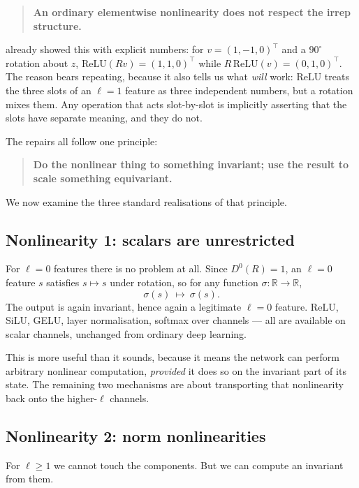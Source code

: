 \documentclass[11pt,a4paper]{report}
\theoremstyle{definition}
\theoremstyle{remark}
\newcommand{\RR}{\mathbb R}
\begin{document}
\begin{quote}
\textbf{An ordinary elementwise nonlinearity does not respect the irrep
structure.}
\end{quote}

 already showed this with explicit numbers: for
$v=(1,-1,0)^\top$ and a $90^\circ$ rotation about $z$,
$\mathrm{ReLU}(Rv)=(1,1,0)^\top$ while $R\,\mathrm{ReLU}(v)=(0,1,0)^\top$.
The reason bears repeating, because it also tells us what \emph{will} work:
$\mathrm{ReLU}$ treats the three slots of an $\ell=1$ feature as three
independent numbers, but a rotation mixes them. Any operation that acts
slot-by-slot is implicitly asserting that the slots have separate meaning,
and they do not.

The repairs all follow one principle:

\begin{quote}
\textbf{Do the nonlinear thing to something invariant; use the result to
scale something equivariant.}
\end{quote}

We now examine the three standard realisations of that principle.

\subsection{Nonlinearity 1: scalars are unrestricted}
\label{sec:nonlin-scalar}

For $\ell=0$ features there is no problem at all. Since $D^0(R)=1$, an
$\ell=0$ feature $s$ satisfies $s\mapsto s$ under rotation, so for any
function $\sigma:\RR\to\RR$,
\[
\sigma(s)\ \longmapsto\ \sigma(s) .
\]
The output is again invariant, hence again a legitimate $\ell=0$ feature.
$\mathrm{ReLU}$, SiLU, GELU, layer normalisation, softmax over channels ---
all are available on scalar channels, unchanged from ordinary deep learning.

This is more useful than it sounds, because it means the network can perform
arbitrary nonlinear computation, \emph{provided} it does so on the invariant
part of its state. The remaining two mechanisms are about transporting that
nonlinearity back onto the higher-$\ell$ channels.

\subsection{Nonlinearity 2: norm nonlinearities}
\label{sec:nonlin-norm}

For $\ell\ge1$ we cannot touch the components. But we can compute an
invariant from them.
\end{document}

